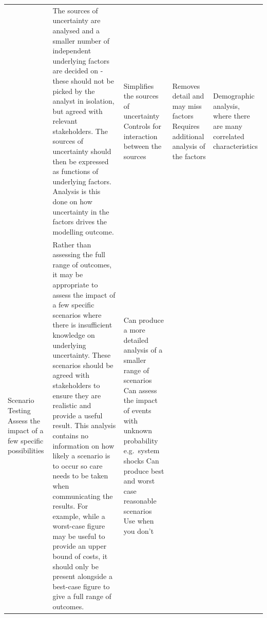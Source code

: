 \documentclass[]{book}
\begin{document}
\begin{longtable}[]{@{}lllll@{}}
\begin{minipage}[t]{0.16\columnwidth}
\end{minipage} & \begin{minipage}[t]{0.26\columnwidth}\raggedright\strut
The sources of uncertainty are analysed and a smaller number of
independent underlying factors are decided on - these should not be
picked by the analyst in isolation, but agreed with relevant
stakeholders. The sources of uncertainty should then be expressed as
functions of underlying factors. Analysis is this done on how
uncertainty in the factors drives the modelling outcome.\strut
\end{minipage} & \begin{minipage}[t]{0.16\columnwidth}\raggedright\strut
Simplifies the sources of uncertainty Controls for interaction between
the sources\strut
\end{minipage} & \begin{minipage}[t]{0.16\columnwidth}\raggedright\strut
Removes detail and may miss factors Requires additional analysis of the
factors\strut
\end{minipage} & \begin{minipage}[t]{0.13\columnwidth}\raggedright\strut
Demographic analysis, where there are many correlated
characteristics\strut
\end{minipage}\tabularnewline
\begin{minipage}[t]{0.16\columnwidth}\raggedright\strut
Scenario Testing Assess the impact of a few specific possibilities\strut
\end{minipage} & \begin{minipage}[t]{0.26\columnwidth}\raggedright\strut
Rather than assessing the full range of outcomes, it may be appropriate
to assess the impact of a few specific scenarios where there is
insufficient knowledge on underlying uncertainty. These scenarios should
be agreed with stakeholders to ensure they are realistic and provide a
useful result. This analysis contains no information on how likely a
scenario is to occur so care needs to be taken when communicating the
results. For example, while a worst-case figure may be useful to provide
an upper bound of costs, it should only be present alongside a best-case
figure to give a full range of outcomes.\strut
\end{minipage} & \begin{minipage}[t]{0.16\columnwidth}\raggedright\strut
Can produce a more detailed analysis of a smaller range of scenarios Can
assess the impact of events with unknown probability e.g.~system shocks
Can produce best and worst case reasonable scenarios Use when you don't

\end{minipage}
\end{longtable}
\end{document}
